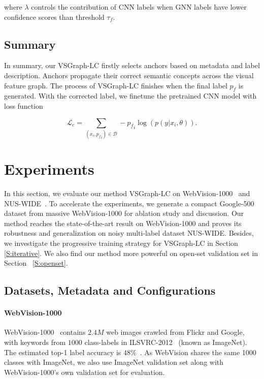 \documentclass[sigconf]{acmart}
\begin{document}
	where $\lambda$ controls the contribution of CNN labels when GNN labels have lower confidence scores than threshold $\tau_f$.
    
    \subsection{Summary}
    In summary, our VSGraph-LC firstly selects anchors based on metadata and label description. Anchors propagate their correct semantic concepts across the visual feature graph. 
    The process of VSGraph-LC finishes when the final label $p_f$ is generated. With the corrected label, we finetune the pretrained CNN model with loss function
    
	\begin{equation}
	\label{E:cnn_loss}
	\mathcal{L}_c=\sum_{(x_i,{p_f}_i)\in \mathcal{D}}-{p_f}_i \log\left(  p(y|x_i,\theta)  \right).
	\end{equation}


	
\section{Experiments}
In this section, we evaluate our method VSGraph-LC on WebVision-1000~\cite{li2017webvision} and NUS-WIDE~\cite{nus-wide-civr09}. To accelerate the experiments, we generate a compact Google-500 dataset from massive WebVision-1000 for ablation study and discussion. Our method reaches the state-of-the-art result on WebVision-1000 and proves its robustness and generalization on noisy multi-label dataset NUS-WIDE. Besides, we investigate the progressive training strategy for VSGraph-LC in Section \ref{S:iterative}. We also find our method more powerful on open-set validation set in Section ~\ref{S:openset}.

\subsection{Datasets, Metadata and Configurations}
\label{S:Dataset}
\paragraph{WebVision-1000} WebVision-1000~\cite{li2017webvision} contains $2.4M$ web images crawled from Flickr and Google, with keywords from $1000$ class-labels in ILSVRC-2012~\cite{deng2009imagenet} (known as ImageNet).
The estimated top-1 label accuracy is $48\%$~\cite{guo2018curriculumnet}. 
As WebVision shares the same 1000 classes with ImageNet, we also use ImageNet validation set along with WebVision-1000's own validation set for evaluation.
\end{document}
